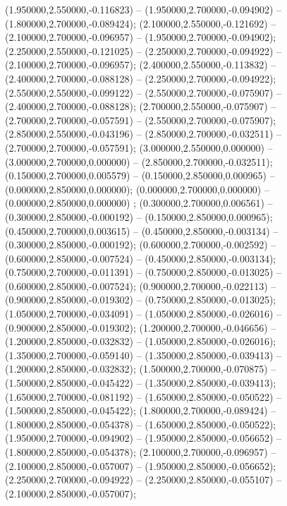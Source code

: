  (1.950000,2.550000,-0.116823) -- (1.950000,2.700000,-0.094902) -- (1.800000,2.700000,-0.089424);
 (2.100000,2.550000,-0.121692) -- (2.100000,2.700000,-0.096957) -- (1.950000,2.700000,-0.094902);
 (2.250000,2.550000,-0.121025) -- (2.250000,2.700000,-0.094922) -- (2.100000,2.700000,-0.096957);
 (2.400000,2.550000,-0.113832) -- (2.400000,2.700000,-0.088128) -- (2.250000,2.700000,-0.094922);
 (2.550000,2.550000,-0.099122) -- (2.550000,2.700000,-0.075907) -- (2.400000,2.700000,-0.088128);
 (2.700000,2.550000,-0.075907) -- (2.700000,2.700000,-0.057591) -- (2.550000,2.700000,-0.075907);
 (2.850000,2.550000,-0.043196) -- (2.850000,2.700000,-0.032511) -- (2.700000,2.700000,-0.057591);
 (3.000000,2.550000,0.000000) -- (3.000000,2.700000,0.000000) -- (2.850000,2.700000,-0.032511);
 (0.150000,2.700000,0.005579) -- (0.150000,2.850000,0.000965) -- (0.000000,2.850000,0.000000);
 (0.000000,2.700000,0.000000) -- (0.000000,2.850000,0.000000) ;
 (0.300000,2.700000,0.006561) -- (0.300000,2.850000,-0.000192) -- (0.150000,2.850000,0.000965);
 (0.450000,2.700000,0.003615) -- (0.450000,2.850000,-0.003134) -- (0.300000,2.850000,-0.000192);
 (0.600000,2.700000,-0.002592) -- (0.600000,2.850000,-0.007524) -- (0.450000,2.850000,-0.003134);
 (0.750000,2.700000,-0.011391) -- (0.750000,2.850000,-0.013025) -- (0.600000,2.850000,-0.007524);
 (0.900000,2.700000,-0.022113) -- (0.900000,2.850000,-0.019302) -- (0.750000,2.850000,-0.013025);
 (1.050000,2.700000,-0.034091) -- (1.050000,2.850000,-0.026016) -- (0.900000,2.850000,-0.019302);
 (1.200000,2.700000,-0.046656) -- (1.200000,2.850000,-0.032832) -- (1.050000,2.850000,-0.026016);
 (1.350000,2.700000,-0.059140) -- (1.350000,2.850000,-0.039413) -- (1.200000,2.850000,-0.032832);
 (1.500000,2.700000,-0.070875) -- (1.500000,2.850000,-0.045422) -- (1.350000,2.850000,-0.039413);
 (1.650000,2.700000,-0.081192) -- (1.650000,2.850000,-0.050522) -- (1.500000,2.850000,-0.045422);
 (1.800000,2.700000,-0.089424) -- (1.800000,2.850000,-0.054378) -- (1.650000,2.850000,-0.050522);
 (1.950000,2.700000,-0.094902) -- (1.950000,2.850000,-0.056652) -- (1.800000,2.850000,-0.054378);
 (2.100000,2.700000,-0.096957) -- (2.100000,2.850000,-0.057007) -- (1.950000,2.850000,-0.056652);
 (2.250000,2.700000,-0.094922) -- (2.250000,2.850000,-0.055107) -- (2.100000,2.850000,-0.057007);
